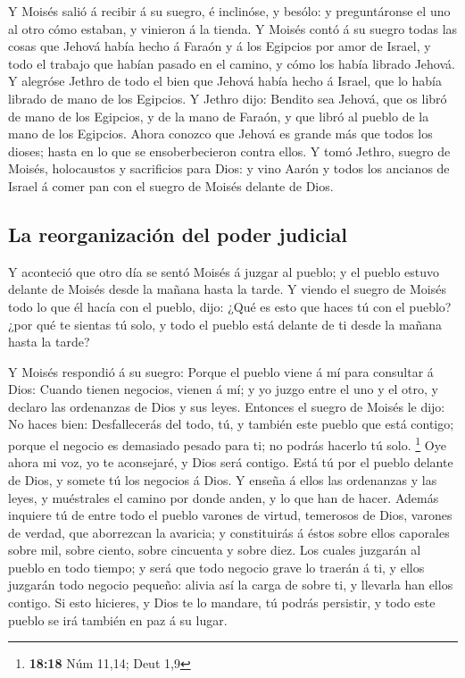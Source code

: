  Y Moisés salió á recibir á su suegro, é inclinóse, y
besólo: y preguntáronse el uno al otro cómo estaban, y vinieron á la
tienda.  Y Moisés contó á su suegro todas las cosas que
Jehová había hecho á Faraón y á los Egipcios por amor de Israel, y todo
el trabajo que habían pasado en el camino, y cómo los había librado
Jehová.  Y alegróse Jethro de todo el bien que Jehová
había hecho á Israel, que lo había librado de mano de los Egipcios.
 Y Jethro dijo: Bendito sea Jehová, que os libró de mano
de los Egipcios, y de la mano de Faraón, y que libró al pueblo de la
mano de los Egipcios.  Ahora conozco que Jehová es grande
más que todos los dioses; hasta en lo que se ensoberbecieron contra
ellos.  Y tomó Jethro, suegro de Moisés, holocaustos y
sacrificios para Dios: y vino Aarón y todos los ancianos de Israel á
comer pan con el suegro de Moisés delante de Dios.

\hypertarget{la-reorganizaciuxf3n-del-poder-judicial}{%
\subsection{La reorganización del poder
judicial}\label{la-reorganizaciuxf3n-del-poder-judicial}}

 Y aconteció que otro día se sentó Moisés á juzgar al
pueblo; y el pueblo estuvo delante de Moisés desde la mañana hasta la
tarde.  Y viendo el suegro de Moisés todo lo que él hacía
con el pueblo, dijo: ¿Qué es esto que haces tú con el pueblo? ¿por qué
te sientas tú solo, y todo el pueblo está delante de ti desde la mañana
hasta la tarde?

 Y Moisés respondió á su suegro: Porque el pueblo viene á
mí para consultar á Dios:  Cuando tienen negocios, vienen
á mí; y yo juzgo entre el uno y el otro, y declaro las ordenanzas de
Dios y sus leyes.  Entonces el suegro de Moisés le dijo:
No haces bien:  Desfallecerás del todo, tú, y también
este pueblo que está contigo; porque el negocio es demasiado pesado para
ti; no podrás hacerlo tú solo. \footnote{\textbf{18:18} Núm 11,14; Deut
  1,9}  Oye ahora mi voz, yo te aconsejaré, y Dios será
contigo. Está tú por el pueblo delante de Dios, y somete tú los negocios
á Dios.  Y enseña á ellos las ordenanzas y las leyes, y
muéstrales el camino por donde anden, y lo que han de hacer.
 Además inquiere tú de entre todo el pueblo varones de
virtud, temerosos de Dios, varones de verdad, que aborrezcan la
avaricia; y constituirás á éstos sobre ellos caporales sobre mil, sobre
ciento, sobre cincuenta y sobre diez.  Los cuales
juzgarán al pueblo en todo tiempo; y será que todo negocio grave lo
traerán á ti, y ellos juzgarán todo negocio pequeño: alivia así la carga
de sobre ti, y llevarla han ellos contigo.  Si esto
hicieres, y Dios te lo mandare, tú podrás persistir, y todo este pueblo
se irá también en paz á su lugar.

